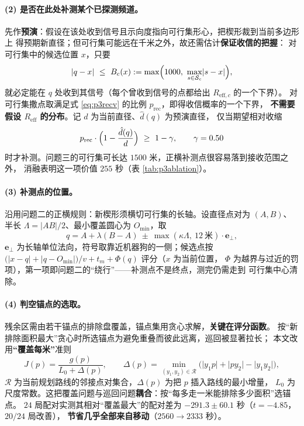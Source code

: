 \documentclass[withoutpreface, bwprint]{cumcmthesis}
\begin{document}
\paragraph{(2) 是否在此处补测某个已探测频道。}
先作\textbf{预演}：假设在该处收到信号且示向度指向可行集形心，把楔形裁到当前多边形上
得预期新直径；但可行集可能远在千米之外，故还需估计\textbf{保证收信的把握}：
对可行集中的候选位置 $x$，只要
\begin{equation}
  \label{eq:p3recv}
  \lvert q-x\rvert\ \le\ B_c(x):=\max\Bigl(1000,\ \max_{s\in \mathcal{S}_c}\lvert s-x\rvert\Bigr),
\end{equation}
就必定能在 $q$ 处收到其信号（每个曾收到信号的点都给出 $R_{\mathrm{eff},c}$ 的一个下界）。
对可行集撒点取满足式 \eqref{eq:p3recv} 的比例 $p_{\mathrm{rec}}$，即得收信概率的一个下界，
\textbf{不需要假设 $R_{\mathrm{eff}}$ 的分布}。记 $d$ 为当前直径、$\hat d(q)$ 为预演直径，
仅当期望相对收缩
\begin{equation}
  \label{eq:p3refine}
  p_{\mathrm{rec}}\cdot\Bigl(1-\frac{\hat d(q)}{d}\Bigr)\ \ge\ 1-\gamma,\qquad \gamma=0.50
\end{equation}
时才补测。问题三的可行集可长达 $1500$ 米，正横补测点很容易落到接收范围之外，
消融表明这一项价值 $255$ 秒（表 \ref{tab:p3ablation}）。

\paragraph{(3) 补测点的位置。}
沿用问题二的正横规则：新楔形须横切可行集的长轴。设直径点对为 $(A,B)$、
半长 $\Lambda=\lvert AB\rvert/2$、最小覆盖圆心为 $O_{\min}$，取
\begin{equation}
  \label{eq:p3refpt}
  q=A+\lambda(B-A)\ \pm\ \max(\kappa\Lambda,\ 12\ \text{米})\cdot\boldsymbol{e}_\perp,
\end{equation}
$\boldsymbol{e}_\perp$ 为长轴单位法向，符号取靠近机器狗的一侧；候选点按
$\bigl(\lvert x-q\rvert+\lvert q-O_{\min}\rvert\bigr)/v+t_m+\Phi(q)$ 评分（$x$ 为当前位置，
$\Phi$ 为越界与过近的罚项），第一项即问题二的“绕行”——补测点不是终点，测完仍需走到
可行集中心清除。

\paragraph{(4) 判空锚点的选取。}
残余区需由若干锚点的排除盘覆盖，锚点集用贪心求解，\textbf{关键在评分函数}。
按“新排除面积最大”贪心时所选锚点为避免重叠而彼此远离，巡回被显著拉长；
本文改用\textbf{“覆盖每米”}准则
\begin{equation}
  \label{eq:p3anchor}
  J(p)=\frac{g(p)}{L_0+\Delta(p)},\qquad
  \Delta(p)=\min_{(y_1,y_2)\in\mathcal{R}}
  \bigl(\lvert y_1p\rvert+\lvert py_2\rvert-\lvert y_1y_2\rvert\bigr),
\end{equation}
$\mathcal{R}$ 为当前规划路线的邻接点对集合，$\Delta(p)$ 为把 $p$ 插入路线的最小增量，
$L_0$ 为尺度常数。这把覆盖问题与巡回问题\textbf{耦合}：按“每多走一米能排除多少面积”选锚点。
$24$ 局配对实测其相对“覆盖最大”的配对差为 $-291.3\pm60.1$ 秒（$t=-4.85$，$20/24$ 局改善），
\textbf{节省几乎全部来自移动}（$2560\to2333$ 秒）。
\end{document}
